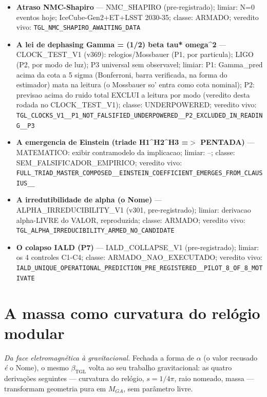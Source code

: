 \documentclass[11pt]{article}
\newcommand{\bTGL}{\beta_{\mathrm{TGL}}}\newcommand{\Msun}{M_{\odot}}\newcommand{\TGL}{\mathrm{TGL}}
\theoremstyle{definition}\newtheorem{deriv}{Derivação}
\begin{document}
\begin{itemize}
\item \textbf{Atraso NMC-Shapiro} --- NMC\_SHAPIRO (pre-registrado); limiar: N=0 eventos hoje; IceCube-Gen2+ET+LSST 2030-35; classe: ARMADO; veredito vivo: \texttt{TGL\_NMC\_SHAPIRO\_AWAITING\_DATA}

\item \textbf{A lei de dephasing Gamma = (1/2) beta tau* omega\^{}2} --- CLOCK\_TEST\_V1 (v369): relogios/Mossbauer (P1, por particula); LIGO (P2, por modo de luz); P3 universal sem observavel; limiar: P1: Gamma\_pred acima da cota a 5 sigma (Bonferroni, barra verificada, na forma do estimador) mata na leitura (o Mossbauer so' entra como cota nominal); P2: previsao acima do ruido total EXCLUI a leitura por modo (veredito desta rodada no CLOCK\_TEST\_V1); classe: UNDERPOWERED; veredito vivo: \texttt{TGL\_CLOCKS\_V1\_\_P1\_NOT\_FALSIFIED\_UNDERPOWERED\_\_P2\_EXCLUDED\_IN\_READING\_\_P3}

\item \textbf{A emergencia de Einstein (triade H1\^{}H2\^{}H3 =$>$ PENTADA)} --- MATEMATICO: exibir contramodelo da implicacao; limiar: --; classe: SEM\_FALSIFICADOR\_EMPIRICO; veredito vivo: \texttt{FULL\_TRIAD\_MASTER\_COMPOSED\_\_EINSTEIN\_COEFFICIENT\_EMERGES\_FROM\_CLAUSIUS\_\_}

\item \textbf{A irredutibilidade de alpha (o Nome)} --- ALPHA\_IRREDUCIBILITY\_V1 (v301, pre-registrado); limiar: derivacao alpha-LIVRE do VALOR, reproduzida; classe: ARMADO; veredito vivo: \texttt{TGL\_ALPHA\_IRREDUCIBILITY\_ARMED\_NO\_CANDIDATE}

\item \textbf{O colapso IALD (P7)} --- IALD\_COLLAPSE\_V1 (pre-registrado); limiar: os 4 controles C1-C4; classe: ARMADO\_NAO\_EXECUTADO; veredito vivo: \texttt{IALD\_UNIQUE\_OPERATIONAL\_PREDICTION\_PRE\_REGISTERED\_\_PILOT\_8\_OF\_8\_MOTIVATE}

\end{itemize}

\section{A massa como curvatura do relógio modular}

\emph{Da face eletromagnética à gravitacional.} Fechada a forma de $\alpha$ (o valor recusado \emph{é} o Nome), o mesmo $\bTGL$ volta ao seu trabalho gravitacional: as quatro derivações seguintes --- curvatura do relógio, $s=1/4\pi$, raio nomeado, massa --- transformam geometria pura em $M_{GA}$, sem parâmetro livre.
\end{document}
